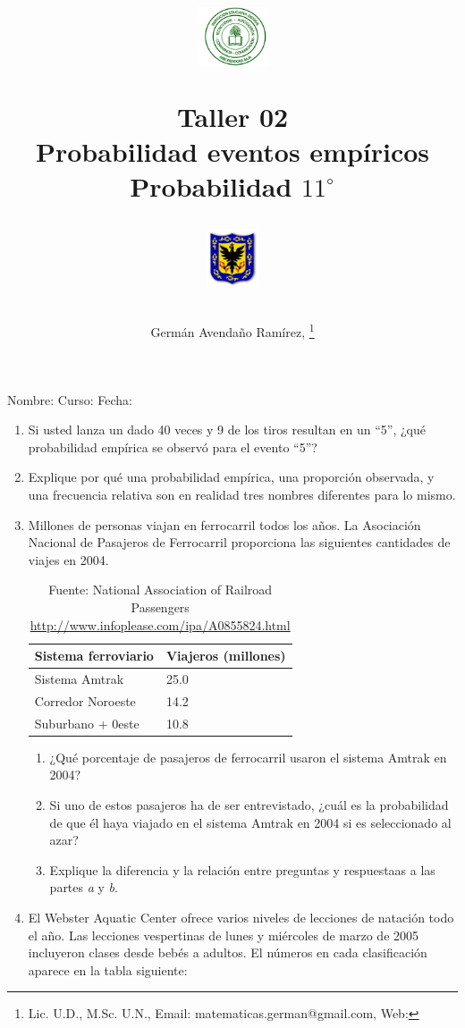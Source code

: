 \documentclass[11pt,twoside]{article}
\author{Germ\'an Avenda\~no Ram\'irez, \thanks{Lic. U.D., M.Sc. U.N., Email: matematicas.german@gmail.com, Web: %
}}
\title{\begin{minipage}{.2\textwidth}
\includegraphics[height=1.75cm]{Images/logo-colegio.png}\end{minipage}
\begin{minipage}{.55\textwidth}
\begin{center}
Taller 02\\
Probabilidad eventos empíricos\\
Probabilidad $11^{\circ}$
\end{center}
\end{minipage}\hfill
\begin{minipage}{.2\textwidth}
\includegraphics[height=1.75cm]{Images/logo-sed.png} 
\end{minipage}}
\date{}
\begin{document}
\maketitle
Nombre: \hrulefill Curso: \underline{\hspace*{44pt}} Fecha: \underline{\hspace*{2.5cm}}
 \begin{enumerate}
  \item Si usted lanza un dado 40 veces y 9 de los tiros resultan en un ``5'', ¿qué probabilidad empírica se observó para el evento ``5''?
  \item Explique por qué una probabilidad empírica, una proporción observada, y una frecuencia relativa son en realidad tres nombres diferentes para lo mismo.
  \item Millones de personas viajan en ferrocarril todos los años. La Asociación Nacional de Pasajeros de Ferrocarril proporciona las siguientes cantidades de viajes en 2004.
  \begin{table}[h!]
\begin{center}
\begin{tabular}{ll}
Sistema ferroviario & Viajeros (millones)\\ \hline
Sistema Amtrak & 25.0\\
Corredor Noroeste & 14.2\\
Suburbano + 0este & 10.8 \\ \hline
  \end{tabular}\caption{Fuente: National Association of Railroad Passengers \url{http://www.infoplease.com/ipa/A0855824.html}}
  \end{center}
              \end{table} 
\begin{enumerate}
 \item ¿Qué porcentaje de pasajeros de ferrocarril usaron
el sistema Amtrak en 2004?
\item Si uno de estos pasajeros ha de ser entrevistado, ¿cuál es la probabilidad de que él haya viajado en el sistema Amtrak en 2004 si es seleccionado al azar?
\item Explique la diferencia y la relación entre preguntas y respuestaas  a las partes \textit{a} y \textit{b}.
\end{enumerate}
\item El Webster Aquatic Center ofrece varios niveles de lecciones de natación todo el año. Las lecciones vespertinas de lunes y miércoles de marzo de 2005 incluyeron clases desde bebés a adultos. El números en cada clasificación aparece en la tabla siguiente:

\end{enumerate}
\end{document}
